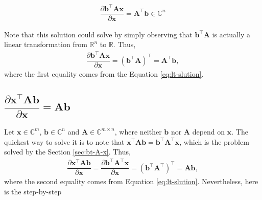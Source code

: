 \documentclass{article}
\newcommand{\trans}{\top}
\begin{document}
\begin{align}
    \boxed{\dfrac{\partial \mathbf{b}^\trans \mathbf{A} \mathbf{x}}{\partial \mathbf{x}} = \mathbf{A}^\trans \mathbf{b} \in \mathbb{C}^{n}}
\end{align}

Note that this solution could solve by simply observing that \(\mathbf{\mathbf{b}^\trans \mathbf{A}}\) is actually a linear transformation from \(\mathbb{R}^{n}\) to \(\mathbb{R}\). Thus,
\begin{align}
    \dfrac{\partial \mathbf{b}^\trans \mathbf{A} \mathbf{x}}{\partial \mathbf{x}} = \left( \mathbf{b}^\trans \mathbf{A} \right)^{\trans} = \mathbf{A}^\trans \mathbf{b},
\end{align}
where the first equality comes from the Equation \eqref{eq:lt-slution}.

\subsection{\(\dfrac{\partial \mathbf{x}^\trans \mathbf{A} \mathbf{b}}{\partial \mathbf{x}} = \mathbf{Ab}\)}
Let \(\mathbf{x} \in \mathbb{C}^{m}\), \(\mathbf{b} \in \mathbb{C}^{n}\) and \(\mathbf{A}\in \mathbb{C}^{m\times n}\), where neither \(\mathbf{b}\) nor \(\mathbf{A}\) depend on \(\mathbf{x}\). The quickest way to solve it is to note that \(\mathbf{x}^\trans \mathbf{A} \mathbf{b} =  \mathbf{b}^\trans \mathbf{A}^\trans \mathbf{x}\), which is the problem solved by the Section \ref{sec:bt-A-x}. Thus,
\begin{align}
    \dfrac{\partial \mathbf{x}^\trans \mathbf{A} \mathbf{b}}{\partial \mathbf{x}} = \dfrac{\partial \mathbf{b}^\trans \mathbf{A}^\trans \mathbf{x}}{\partial \mathbf{x}} = \left( \mathbf{b}^\trans \mathbf{A}^\trans \right)^{\trans} = \mathbf{A} \mathbf{b},
\end{align}
where the second equality comes from Equation \eqref{eq:lt-slution}. Nevertheless, here is the step-by-step
\end{document}
